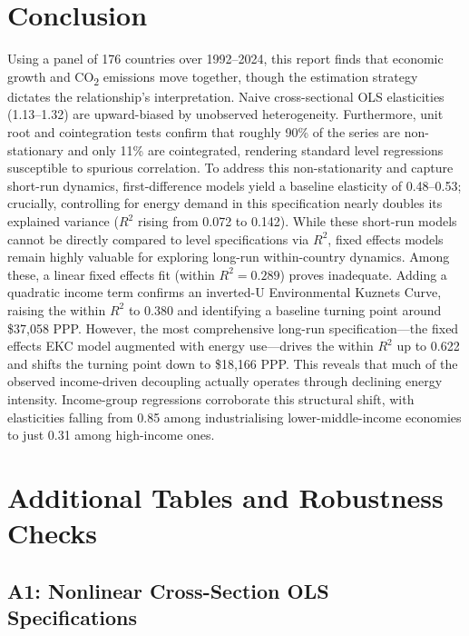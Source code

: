 \documentclass[12pt, a4paper]{article}
\begin{document}
\section{Conclusion}
 
Using a panel of 176 countries over 1992--2024, this report finds that economic growth and CO\textsubscript{2} emissions move together, though the estimation strategy dictates the relationship's interpretation. Naive cross-sectional OLS elasticities (1.13--1.32) are upward-biased by unobserved heterogeneity. Furthermore, unit root and cointegration tests confirm that roughly 90\% of the series are non-stationary and only 11\% are cointegrated, rendering standard level regressions susceptible to spurious correlation. To address this non-stationarity and capture short-run dynamics, first-difference models yield a baseline elasticity of 0.48--0.53; crucially, controlling for energy demand in this specification nearly doubles its explained variance ($R^2$ rising from 0.072 to 0.142). While these short-run models cannot be directly compared to level specifications via $R^2$, fixed effects models remain highly valuable for exploring long-run within-country dynamics. Among these, a linear fixed effects fit (within $R^2 = 0.289$) proves inadequate. Adding a quadratic income term confirms an inverted-U Environmental Kuznets Curve, raising the within $R^2$ to 0.380 and identifying a baseline turning point around \$37,058 PPP. However, the most comprehensive long-run specification---the fixed effects EKC model augmented with energy use---drives the within $R^2$ up to 0.622 and shifts the turning point down to \$18,166 PPP. This reveals that much of the observed income-driven decoupling actually operates through declining energy intensity. Income-group regressions corroborate this structural shift, with elasticities falling from 0.85 among industrialising lower-middle-income economies to just 0.31 among high-income ones.

\newpage
\appendix

\section{Additional Tables and Robustness Checks}

\subsection*{A1: Nonlinear Cross-Section OLS Specifications}
\end{document}
